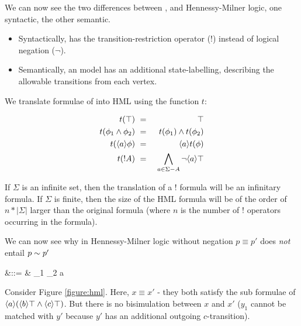 \NI We can now see the two differences between \ELFULL{}, and
Hennessy-Milner logic, one syntactic, the other semantic.

\begin{itemize}

\item Syntactically, \ELABR{} has the transition-restriction operator ($!$)
  instead of logical negation ($\neg$).

\item Semantically, an \ELABR{} model has an additional state-labelling,
  describing the allowable transitions from each vertex.

\end{itemize}

\NI We translate formulae of \ELABR{} into HML using the function $t$:

\begin{eqnarray*}
  t(\top) & \ = \ & \top  \\
  t(\phi_1 \land \phi_2) & \ = \ & t(\phi_1) \land t(\phi_2)  \\
  t(\langle a \rangle \phi) & \ = \ & \langle a \rangle t(\phi)  \\
  t(! A) & \ = \ & \bigwedge_{a \in \Sigma - A} \neg \langle a \rangle \top 
\end{eqnarray*}

\NI If $\Sigma$ is an infinite set, then the translation of a $!$
formula will be an infinitary formula.  If $\Sigma$ is finite,
then the size of the HML formula will be of the order of $n *
| \Sigma |$ larger than the original \ELABR{} formula (where $n$ is the
number of $!$ operators occurring in the \ELABR{} formula).


We can now see why in Hennessy-Milner logic without negation $p \equiv
p'$ does \emph{not} entail $p \sim p'$

\begin{GRAMMAR}
  \phi 
    &\quad ::= \quad&
  \top \fOr \phi_1 \AND \phi_2  \fOr \langle a \rangle \phi
\end{GRAMMAR}



\NI Consider Figure \ref{figure:hml}.  Here, $x \equiv x'$ - they both
satisfy the sub formulae of $\langle a \rangle (\langle b \rangle \top
\land \langle c \rangle \top)$.  But there is no bisimulation between
$x$ and $x'$ ($y_1$ cannot be matched with $y'$ because $y'$ has an
additional outgoing $c$-transition).


